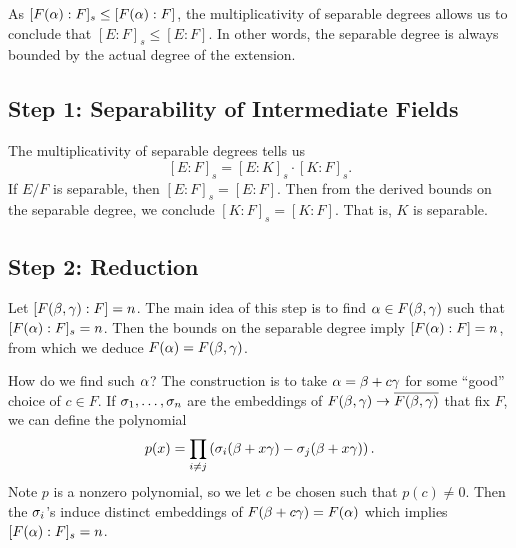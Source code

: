 As $[F(\alpha):F]_s \leq [F(\alpha):F]$, the multiplicativity of separable degrees allows us to conclude that $[E:F]_s \leq [E:F]$. In other words, the separable degree is always bounded by the actual degree of the extension.

\subsection{Step 1: Separability of Intermediate Fields}
The multiplicativity of separable degrees tells us
\[
    [E:F]_s = [E:K]_s \cdot [K:F]_s.
\]
If $E/F$ is separable, then $[E:F]_s = [E:F]$. Then from the derived bounds on the separable degree, we conclude $[K:F]_s = [K:F]$. That is, $K$ is separable.

\subsection{Step 2: Reduction}
Let $[F(\beta,\gamma):F] = n$. The main idea of this step is to find $\alpha \in F(\beta,\gamma)$ such that $[F(\alpha):F]_s = n$. Then the bounds on the separable degree imply $[F(\alpha):F] = n$, from which we deduce $F(\alpha) = F(\beta,\gamma)$.

How do we find such $\alpha$? The construction is to take $\alpha = \beta + c\gamma$ for some ``good'' choice of $c \in F$. If $\sigma_1, \dots, \sigma_n$ are the embeddings of $F(\beta,\gamma) \to \overline{F(\beta,\gamma)}$ that fix $F$, we can define the polynomial
\[
    p(x) = \prod_{i \neq j} \left( \sigma_i(\beta + x\gamma) - \sigma_j(\beta + x\gamma) \right).
\]
Note $p$ is a nonzero polynomial, so we let $c$ be chosen such that $p(c) \neq 0$. Then the $\sigma_i$'s induce distinct embeddings of $F(\beta + c\gamma) = F(\alpha)$ which implies $[F(\alpha):F]_s = n$.